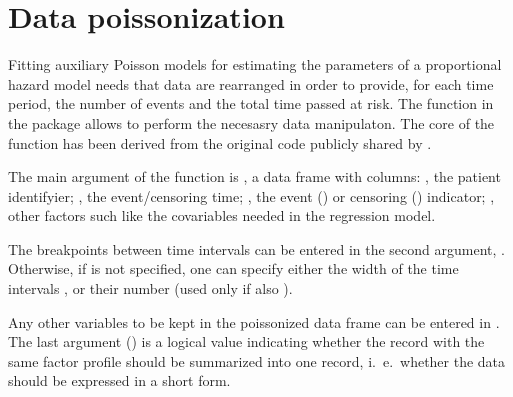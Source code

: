 \documentclass[]{scrartcl}\usepackage[]{graphicx}\usepackage[]{color}
\begin{document}
{{
{}

\appendix
\section{Data poissonization}\label{sec:poisson}
Fitting auxiliary Poisson models for estimating the parameters of 
  a proportional hazard model \citep{Whitehead80, crowtherEtal12}
  needs that data are rearranged in order to provide,
  for each time period, the number of events and the 
  total time passed at risk.
The function  in the  package
  allows to perform the necesasry data manipulaton.
The core of the function has been derived from the original code
  publicly shared by \cite{Koval}.

The main argument of the  function is
  , a data frame with columns: 
  , the patient identifyier;
  , the event/censoring time;
  , the event () or censoring () indicator;
  , other factors such like the covariables needed
  in the regression model.

The breakpoints between time intervals can be entered in the second argument,
  .
Otherwise, if  is not specified,
  one can specify either the width of the time intervals ,
  or their number 
  (used only if also ).

Any other variables to be kept in the poissonized data frame can be entered in
  .
The last argument () is a logical value
  indicating whether the record with the same factor profile
  should be summarized into one record,
  i.~e.\ whether the data should be expressed in a short form.

}}
\end{document}
